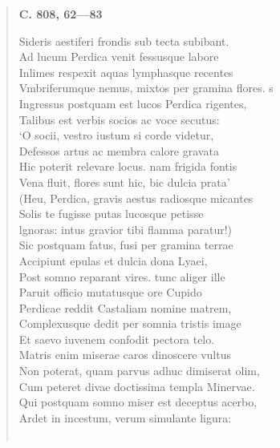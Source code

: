 \documentclass[11pt, a4paper]{report}
\begin{document}
\begin{verse}
     \marginpar{[288]} \begin{center} \textbf{C. 808, 62—83} \end{center}Sideris aestiferi frondis sub tecta subibant. \\ Ad lucum Perdica venit fessusque labore \\ Inlimes respexit aquas lymphasque recentes \\ Vmbriferumque nemus, mixtos per gramina flores. s \\ Ingressus postquam est lucos Perdica rigentes, \\ Talibus est verbis socios ac voce secutus: \\ ‘O socii, vestro iustum si corde videtur, \\ Defessos artus ac membra calore gravata \\ Hic poterit relevare locus. nam frigida fontis \\ Vena fluit, flores sunt hic,  \lbrack bic \rbrack  dulcia prata’ \\ (Heu, Perdica, gravis aestus radiosque micantes \\ Solis te fugisse putas lucosque petisse \\ lgnoras: intus gravior tibi flamma paratur!) \\ Sic postquam fatus, fusi per gramina terrae \\ Accipiunt epulas et dulcia dona Lyaei, \\ Post somno reparant vires. tunc aliger ille \\ Paruit officio mutatusque ore Cupido \\ Perdicae reddit Castaliam nomine matrem, \\ Complexusque dedit per somnia tristis image \\ Et saevo iuvenem confodit pectora telo. \\ Matris enim miserae caros dinoscere vultus \\ Non poterat, quam parvus adhuc dimiserat olim, \\ Cum peteret divae doctissima templa Minervae. \\ Qui postquam somno miser est deceptus acerbo, \\ Ardet in incestum, verum simulante ligura: \\ 
        ﻿\pagebreak 

\end{verse}
\end{document}
